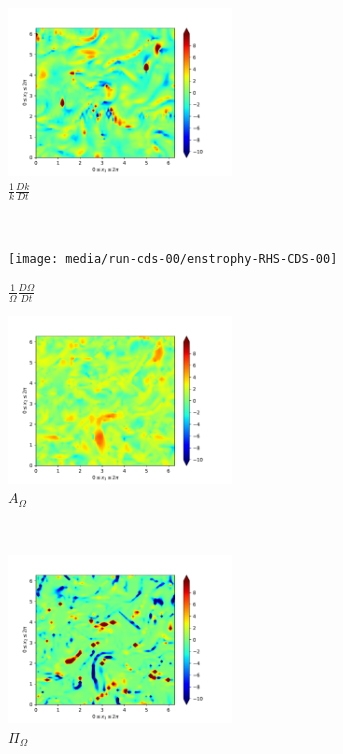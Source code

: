 \begin{figure}[H]
    \begin{subfigure}[H]{0.45\textwidth}
        \includegraphics[height=1.75in]{media/run-cds-00/ke-RHS-CDS-00}
        \caption{$\frac{1}{k} \frac{Dk}{Dt}$}
    \end{subfigure}
    ~
    \begin{subfigure}[H]{0.45\textwidth}
        \texttt{[image: media/run-cds-00/enstrophy-RHS-CDS-00]}
        \caption{$\frac{1}{\Omega} \frac{D \Omega}{Dt}$}
    \end{subfigure}
    \newline
    \begin{subfigure}{0.45\textwidth}
        \includegraphics[height=1.75in]{media/run-cds-00/A-enst-CDS-00}
        \caption{$A_{\Omega}$}
    \end{subfigure}
    ~
    \begin{subfigure}{0.45\textwidth}
        \includegraphics[height=1.75in]{media/run-cds-00/trans-enst-CDS-00}
        \caption{$\Pi_{\Omega}$}
    \end{subfigure}
    \newline
    \begin{subfigure}{0.45\textwidth}

\end{subfigure}
\end{figure}
